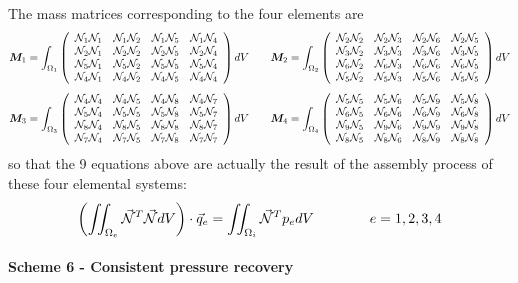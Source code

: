 The mass matrices corresponding to the four elements are 
\[
{\bm M}_1 = \int_{\Omega_1} \left( \begin{array}{cccc}
 \bN_1 \bN_1 & \bN_1 \bN_2 & \bN_1 \bN_5 & \bN_1 \bN_4 \\
 \bN_2 \bN_1 & \bN_2 \bN_2 & \bN_2 \bN_5 & \bN_2 \bN_4 \\
 \bN_5 \bN_1 & \bN_5 \bN_2 & \bN_5 \bN_5 & \bN_5 \bN_4 \\
 \bN_4 \bN_1 & \bN_4 \bN_2 & \bN_4 \bN_5 & \bN_4 \bN_4 
\end{array}\right) dV
\qquad
{\bm M}_2 = \int_{\Omega_2} \left( \begin{array}{cccc}
 \bN_2 \bN_2 & \bN_2 \bN_3 & \bN_2 \bN_6 & \bN_2 \bN_5 \\
 \bN_3 \bN_2 & \bN_3 \bN_3 & \bN_3 \bN_6 & \bN_3 \bN_5 \\
 \bN_6 \bN_2 & \bN_6 \bN_3 & \bN_6 \bN_6 & \bN_6 \bN_5 \\
 \bN_5 \bN_2 & \bN_5 \bN_3 & \bN_5 \bN_6 & \bN_5 \bN_5 
\end{array}\right) dV
\]
\[
{\bm M}_3 = \int_{\Omega_3} \left( \begin{array}{cccc}
 \bN_4 \bN_4 & \bN_4 \bN_5 & \bN_4 \bN_8 & \bN_4 \bN_7 \\
 \bN_5 \bN_4 & \bN_5 \bN_5 & \bN_5 \bN_8 & \bN_5 \bN_7 \\
 \bN_8 \bN_4 & \bN_8 \bN_5 & \bN_8 \bN_8 & \bN_8 \bN_7 \\
 \bN_7 \bN_4 & \bN_7 \bN_5 & \bN_7 \bN_8 & \bN_7 \bN_7 
\end{array}\right) dV
\qquad
{\bm M}_4 = \int_{\Omega_4} \left( \begin{array}{cccc}
 \bN_5 \bN_5 & \bN_5 \bN_6 & \bN_5 \bN_9 & \bN_5 \bN_8 \\
 \bN_6 \bN_5 & \bN_6 \bN_6 & \bN_6 \bN_9 & \bN_6 \bN_8 \\
 \bN_9 \bN_5 & \bN_9 \bN_6 & \bN_9 \bN_9 & \bN_9 \bN_8 \\
 \bN_8 \bN_5 & \bN_8 \bN_6 & \bN_8 \bN_9 & \bN_8 \bN_8 
\end{array}\right) dV
\]
so that the 9 equations above are actually the result of the assembly process of these four 
elemental systems:
\[
\left( \iint_{\Omega_e} \vec{\bN}^T\vec{\bN} dV \right) \cdot \vec{q}_e = \iint_{\Omega_i} \vec{\bN}^T p_e dV 
\qquad\qquad e=1,2,3,4
\]


\paragraph{Scheme 6 - Consistent pressure recovery}

